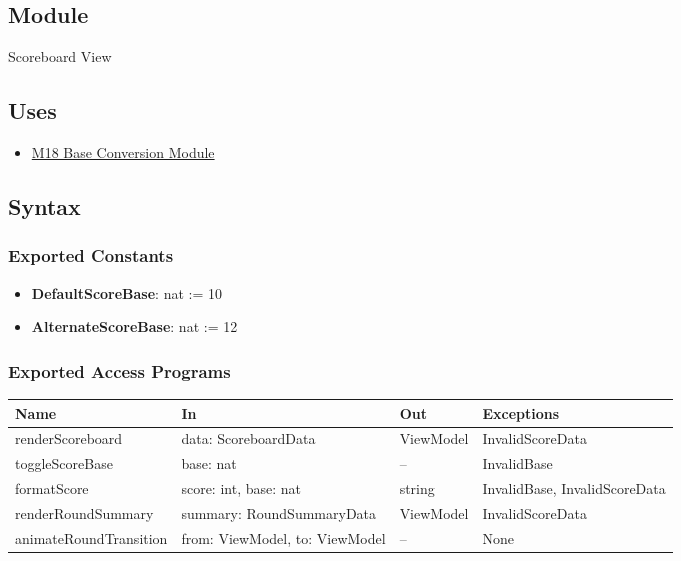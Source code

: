 \documentclass[12pt, titlepage]{article}
\begin{document}
\subsection{Module}
Scoreboard View

\subsection{Uses}
\begin{itemize}
    \item \hyperref[sec:base-conversion-module]{M18 Base Conversion Module}
\end{itemize}

\subsection{Syntax}

\subsubsection{Exported Constants}
\begin{itemize}
    \item \textbf{DefaultScoreBase}: nat := 10
    \item \textbf{AlternateScoreBase}: nat := 12
\end{itemize}

\subsubsection{Exported Access Programs}

\begin{center}
\begin{tabular}{p{4.5cm} p{4.5cm} p{3.5cm} p{3.5cm}}
\toprule
\textbf{Name} & \textbf{In} & \textbf{Out} & \textbf{Exceptions} \\
\midrule
renderScoreboard & data: ScoreboardData & ViewModel & InvalidScoreData \\
toggleScoreBase & base: nat & -- & InvalidBase \\
formatScore & score: int, base: nat & string & InvalidBase, InvalidScoreData \\
renderRoundSummary & summary: RoundSummaryData & ViewModel & InvalidScoreData \\
animateRoundTransition & from: ViewModel, to: ViewModel & -- & None \\
\bottomrule
\end{tabular}
\end{center}
\end{document}
